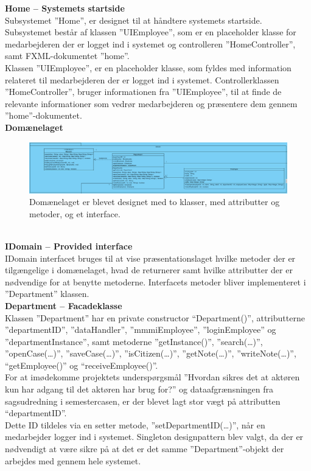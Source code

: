 \textbf{Home – Systemets startside} \\
Subsystemet ”Home”, er designet til at håndtere systemets startside. Subsystemet består af klassen ”UIEmployee”, som er en placeholder klasse for medarbejderen der er logget ind i systemet og controlleren ”HomeController”, samt FXML-dokumentet ”home”.\\
Klassen ”UIEmployee”, er en placeholder klasse, som fyldes med information relateret til medarbejderen der er logget ind i systemet. Controllerklassen ”HomeController”, bruger informationen fra ”UIEmployee”, til at finde de relevante informationer som vedrør medarbejderen og præsentere dem gennem ”home”-dokumentet.\\
\textbf{Domænelaget}
\begin{figure}[htb!]
  \includegraphics[width = \linewidth]{./PNG/design/domaeneOpdateretKlassediagram.PNG} 
  \caption{Domænelaget er blevet designet med to klasser, med attributter og metoder, og et interface.}
  \label{fig:2dom}
\end{figure}
\\\textbf{IDomain – Provided interface}\\
IDomain interfacet bruges til at vise præsentationslaget hvilke metoder der er tilgængelige i domænelaget, hvad de returnerer samt hvilke attributter der er nødvendige for at benytte metoderne. Interfacets metoder bliver implementeret i ”Department” klassen.\\
\textbf{Department – Facadeklasse}\\
Klassen ”Department” har en private constructor “Department()”, attributterne ”departmentID”, ”dataHandler”, ”mmmiEmployee”, ”loginEmployee” og ”departmentInstance”, samt metoderne ”getInstance()”, ”search(…)”, ”openCase(…)”, ”saveCase(…)”, ”isCitizen(…)”, ”getNote(…)”, ”writeNote(…)”, “getEmployee()” og “receiveEmployee()”.\\
For at imødekomme projektets underspørgsmål ”Hvordan sikres det at aktøren kun har adgang til det aktøren har brug for?” og dataafgrænsningen fra sagsudredning i semestercasen, er der blevet lagt stor vægt på attributten “departmentID”. \\
Dette ID tildeles via en setter metode, ”setDepartmentID(…)”, når en medarbejder logger ind i systemet. Singleton designpattern blev valgt, da der er nødvendigt at være sikre på at det er det samme ”Department”-objekt der arbejdes med gennem hele systemet.\\
